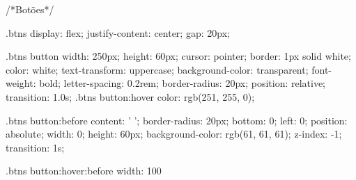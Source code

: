 /*Botões*/

.btns {
    display: flex;
    justify-content: center;
    gap: 20px;
}

.btns button {
    width: 250px;
    height: 60px;
    cursor: pointer;
    border: 1px solid white;
    color: white;
    text-transform: uppercase;
    background-color: transparent;
    font-weight: bold;
    letter-spacing: 0.2rem;
    border-radius: 20px;
    position: relative;
    transition: 1.0s;
}
.btns button:hover {
    color: rgb(251, 255, 0);
}


.btns button:before {
    content: ' ';
    border-radius: 20px;
    bottom: 0;
    left: 0;
    position: absolute;
    width: 0;
    height: 60px;
    background-color: rgb(61, 61, 61);
    z-index: -1;
    transition: 1s;
}

.btns button:hover:before {
   width: 100%
}
